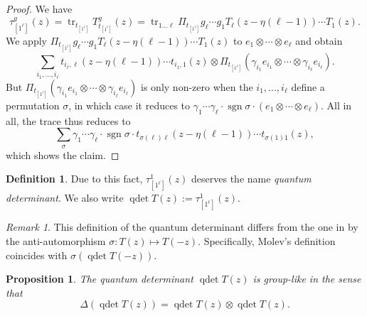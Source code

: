 \documentclass[11pt]{report}
\newtheorem{prop}[theorem]{Proposition}
\theoremstyle{definition}
\newtheorem{definition}[theorem]{Definition}
\theoremstyle{remark}
\newtheorem*{remark}{Remark}
\theoremstyle{remark}
\begin{document}
\begin{proof}
We have
\begin{equation*}
\tau_{[1^\ell]}^g(z) = \operatorname{tr}_{t_{[1^\ell]}} T_{t_{[1^\ell]}}^g(z) = \operatorname{tr}_{1...\ell} \Pi_{t_{[1^\ell]}} g_\ell \cdots g_1 T_\ell(z-\eta(\ell-1)) \cdots T_1(z).
\end{equation*}
We apply $\Pi_{t_{[1^\ell]}} g_\ell \cdots g_1 T_\ell(z-\eta(\ell-1)) \cdots T_1(z)$ to $e_1 \otimes \cdots \otimes e_\ell$ and obtain
\begin{equation*}
\sum_{i_1,...,i_\ell} t_{i_\ell,\ell}(z-\eta(\ell-1)) \cdots t_{i_1,1}(z) \otimes \Pi_{t_{[1^\ell]}} (\gamma_{i_1} e_{i_1} \otimes \cdots \otimes \gamma_{i_\ell} e_{i_\ell}).
\end{equation*}
But $\Pi_{t_{[1^\ell]}} (\gamma_{i_1} e_{i_1} \otimes \cdots \otimes \gamma_{i_\ell} e_{i_\ell})$ is only non-zero when the $i_1,...,i_\ell$ define a permutation $\sigma$, in which case it reduces to $\gamma_1 \cdots \gamma_\ell \cdot \operatorname{sgn} \sigma \cdot (e_1 \otimes \cdots \otimes e_\ell)$. All in all, the trace thus reduces to
\begin{equation*}
\sum_\sigma \gamma_1 \cdots \gamma_\ell \cdot \operatorname{sgn} \sigma \cdot t_{\sigma(\ell)\ell}(z-\eta(\ell-1)) \cdots t_{\sigma(1)1}(z),
\end{equation*}
which shows the claim.
\end{proof}

\begin{definition}
Due to this fact, $\tau_{[1^\ell]}^1(z)$ deserves the name \emph{quantum determinant}. We also write $\operatorname{qdet} T(z) := \tau_{[1^\ell]}^1(z)$.
\end{definition}

\begin{remark}
This definition of the quantum determinant differs from the one in \cite{book:molev} by the anti-automorphism $\sigma: T(z) \mapsto T(-z)$. Specifically, Molev's definition coincides with $\sigma(\operatorname{qdet} T(-z))$.
\end{remark}

\begin{prop}\label{prop:quantumDetGroupLike}
The quantum determinant $\operatorname{qdet} T(z)$ is group-like in the sense that
\begin{equation*}
\Delta(\operatorname{qdet} T(z)) = \operatorname{qdet} T(z) \otimes \operatorname{qdet} T(z).
\end{equation*}
\end{prop}
\end{document}
